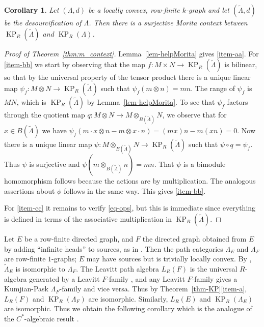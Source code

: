 \documentclass[a4paper,12pt]{amsart}
\numberwithin{equation}{section}
\newtheorem{cor}[thm]{Corollary}
\theoremstyle{definition}
\theoremstyle{remark}
\begin{document}
\begin{cor}\label{cor-Morita} Let $(\Lambda,d)$ be a locally convex, row-finite $k$-graph and let $(\tilde{\Lambda}, d)$ be the 
desourcification of $\Lambda$. Then there is a surjective Morita context between $\operatorname{KP}_R({\tilde{\Lambda}})$ and $\operatorname{KP}_R(\Lambda)$.
\end{cor}

\begin{proof}[Proof of Theorem~\ref{thm:m_context}]
Lemma~\ref{lem-helpMorita} gives \eqref{item-aa}. For \eqref{item-bb} we start by observing that the map $f:M\times N\to\operatorname{KP}_R({\tilde{\Lambda}})$ is bilinear, so that by the universal property of the tensor product there is a unique linear map $\psi_f:M\otimes N\to \operatorname{KP}_R({\tilde{\Lambda}})$ such that $\psi_f(m\otimes n)=mn$. The range of $\psi_f$ is $MN$, which is $\operatorname{KP}_R({\tilde{\Lambda}})$ by Lemma~\ref{lem-helpMorita}. To see that $\psi_f$ factors through the quotient map $q:M\otimes N\to  M \otimes_{B(\tilde\Lambda)} N$, we observe that for $x\in {B(\tilde\Lambda)}$ we have
$
\psi_f(m\cdot x\otimes n-m\otimes x\cdot n)=(mx)n-m(xn)=0.
$
Now there is a unique linear map $\psi:M \otimes_{B(\tilde\Lambda)} N \to \operatorname{KP}_R(\tilde{\Lambda})$ such that $\psi\circ q=\psi_f$. Thus $\psi$ is surjective and $\psi(m \otimes_{B(\tilde\Lambda)} n ) = mn$. That $\psi$ is a bimodule homomorphism follows because the actions are by multiplication.
The analogous assertions about $\phi$ follows in the same way. This gives \eqref{item-bb}.

For \eqref{item-cc} it remains to verify \eqref{eq-ops}, but this is immediate since everything is defined in terms of the associative multiplication in $\operatorname{KP}_R({\tilde{\Lambda}})$.
\end{proof}
  
Let $E$ be a row-finite directed graph, and $F$ the directed graph obtained from $E$ by adding ``infinite heads'' to sources, as in \cite[page~310]{BPRS}.  Then the path categories $\Lambda_E$ and $\Lambda_F$ are row-finite $1$-graphs; $E$ may have sources but is trivially locally convex.  
By \cite[Proposition~4.11]{W}, ${\tilde\Lambda}_E$ is isomorphic to $\Lambda_F$. 
The Leavitt path algebra $L_R(F)$ is the universal $R$-algebra generated by a Leavitt $F$-family \cite[Definition~3.1]{T}, and any Leavitt $F$-family gives a Kumjian-Pask $\Lambda_F$-family and vice versa.   Thus by Theorem~\ref{thm-KP}\eqref{item-a}, $L_R(F)$ and $\operatorname{KP}_R(\Lambda_F)$ are isomorphic. Similarly, $L_R(E)$ and $\operatorname{KP}_R(\Lambda_E)$ are isomorphic. Thus we obtain the following corollary which is the analogue of the $C^*$-algebraic result \cite[Lemma~1.2(c)]{BPRS}.
\end{document}
